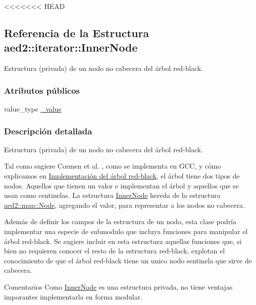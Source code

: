 <<<<<<< HEAD
\hypertarget{structaed2_1_1iterator_1_1InnerNode}{\subsection{\-Referencia de la \-Estructura aed2\-:\-:iterator\-:\-:\-Inner\-Node}
\label{structaed2_1_1iterator_1_1InnerNode}
}


\-Estructura (privada) de un nodo no cabecera del árbol red-\/black.  


\subsubsection*{\-Atributos públicos}
\begin{DoxyCompactItemize}
\item 
value\-\_\-type \hyperlink{structaed2_1_1iterator_1_1InnerNode_a3d80723a2dd1b746c0687f39fbc3d5e2_a3d80723a2dd1b746c0687f39fbc3d5e2}{\-\_\-value}
\end{DoxyCompactItemize}


\subsubsection{\-Descripción detallada}
\-Estructura (privada) de un nodo no cabecera del árbol red-\/black. 

\-Tal como sugiere \-Cormen et al. \cite{CormenLeisersonRivestStein2009}, como se implementa en \-G\-C\-C, y cómo explicamos en \hyperlink{Implementacion}{\-Implementación del árbol red-\/black}, el árbol tiene dos tipos de nodos. \-Aquellos que tienen un valor e implementan el árbol y aquellos que se usan como centinelas. \-La estructura \hyperlink{structaed2_1_1iterator_1_1InnerNode}{\-Inner\-Node} hereda de la estructura \hyperlink{structaed2_1_1map_1_1Node}{aed2\-::map\-::\-Node}, agregando el valor, para representar a los nodos no cabecera.

\-Además de definir los campos de la estructura de un nodo, esta clase podría implementar una especie de submodulo que incluya funciones para manipular el árbol red-\/black. \-Se sugiere incluir en esta estructura aquellas funciones que, si bien no requieren conocer el resto de la estructura red-\/black, explotan el conocimiento de que el árbol red-\/black tiene un unico nodo sentinela que sirve de cabecera.

\begin{DoxyRemark}{\-Comentarios}
\-Como \hyperlink{structaed2_1_1iterator_1_1InnerNode}{\-Inner\-Node} es una estructura privada, no tiene ventajas imporantes implementarla en forma modular. 
\end{DoxyRemark}


